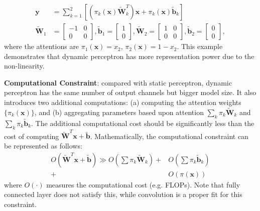 \documentclass[10pt,twocolumn,letterpaper]{article}
\begin{document}
\begin{align}
\bm{y} &= \sum_{k=1}^2\left[\left(\pi_k(\bm{x})\bm{\tilde{W}}_k^T\right)\bm{x}+\pi_k(\bm{x})\bm{\tilde{b}}_k\right] \nonumber \\
\bm{\tilde{W}}_1&=\begin{bmatrix}
    -1 & 0 \\ 0 & 0
\end{bmatrix},
\bm{\tilde{b}}_1=\begin{bmatrix}
    1 \\ 0
\end{bmatrix},
\bm{\tilde{W}}_2=\begin{bmatrix}
    1 & 0 \\ 0 & 0
\end{bmatrix},
\bm{\tilde{b}}_2=\begin{bmatrix}
    0 \\ 0
\end{bmatrix},
\label{eq:dynamic-xor}
\end{align}
where the attentions are $\pi_1(\bm{x})=x_2$, $\pi_2(\bm{x})=1-x_2$. This example demonstrates that dynamic perceptron has more representation power due to the non-linearity.  
\fi

\noindent \textbf{Computational Constraint}: compared with static perceptron, dynamic perceptron has the same number of output channels but bigger model size. It also introduces two additional computations: (a) computing the attention weights $\{\pi_k(\bm{x})\}$, and (b) aggregating parameters based upon attention $\sum_k\pi_k\bm{\tilde{W}}_k$ and $\sum_k\pi_k\bm{\tilde{b}}_k$. The additional computational cost should be significantly less than the cost of computing $\bm{\tilde{W}}^T\bm{x}+\bm{\tilde{b}}$. Mathematically, the computational constraint can be represented as follows:
\begin{align}
O(\bm{\tilde{W}}^T\bm{x}+\bm{\tilde{b}}) \gg O\left(\sum\pi_k\tilde{\bm{W}}_k\right)+&O\left(\sum\pi_k\tilde{\bm{b}}_k\right) \nonumber \\
+&O\left(\pi(\bm{x})\right)
\label{eq:dp-efficient}
\end{align}
where $O(\cdot)$ measures the computational cost (e.g. FLOPs). Note that fully connected layer does not satisfy this, while convolution is a proper fit for this constraint.
\end{document}
